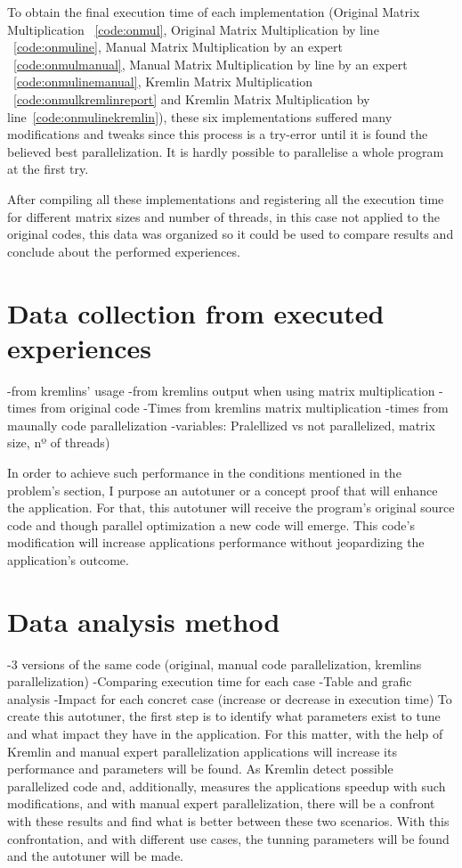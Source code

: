 To obtain the final execution time of each implementation (Original Matrix Multiplication ~\ref{code:onmul}, Original Matrix Multiplication by line ~\ref{code:onmuline}, Manual Matrix Multiplication by an expert ~\ref{code:onmulmanual}, Manual Matrix Multiplication by line by an expert ~\ref{code:onmulinemanual}, Kremlin Matrix Multiplication ~\ref{code:onmulkremlinreport} and Kremlin Matrix Multiplication by line~\ref{code:onmulinekremlin}), these six implementations suffered many modifications and tweaks since this process is a try-error until it is found the believed best parallelization. It is hardly possible to parallelise a whole program at the first try.

After compiling all these implementations and registering all the execution time for different matrix sizes and number of threads, in this case not applied to the original codes, this data was organized so it could be used to compare results and conclude about the performed experiences.

\section{Data collection from executed experiences}
-from kremlins' usage
-from kremlins output when using matrix multiplication
-times from original code
-Times from kremlins matrix multiplication
-times from maunally code parallelization
-variables: Pralellized vs not parallelized, matrix size, nº of threads)


In order to achieve such performance in the conditions mentioned in the problem's section, I purpose an autotuner or a concept proof that will enhance the application. For that, this autotuner will receive the program's original source code and though parallel optimization a new code will emerge. This code's modification will increase applications performance without jeopardizing the application's outcome.

\section{Data analysis method}
-3 versions of the same code (original, manual code parallelization, kremlins parallelization)
-Comparing execution time for each case
-Table and grafic analysis
-Impact for each concret case (increase or decrease in execution time)
To create this autotuner, the first step is to identify what parameters exist to tune and what impact they have in the application. For this matter, with the help of Kremlin and manual expert parallelization applications will increase its performance and parameters will be found. As Kremlin detect possible parallelized code and, additionally, measures the applications speedup with such modifications, and with manual expert parallelization, there will be a confront with these results and find what is better between these two scenarios. With this confrontation, and with different use cases, the tunning parameters will be found and the autotuner will be made.


